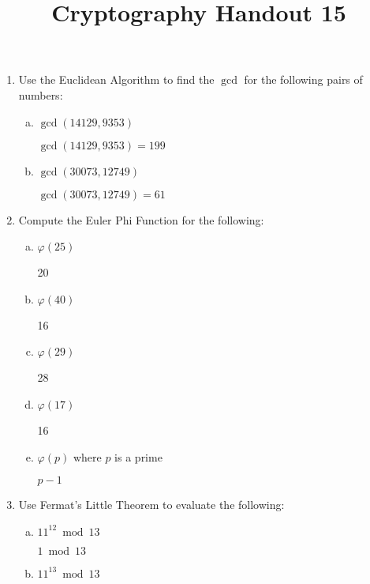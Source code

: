 \documentclass[12pt]{amsart}
\makeatletter
\def\subtitle#1{\gdef\@subtitle{#1}}
\def\@subtitle{}
\theoremstyle{plain}
\theoremstyle{definition}
\theoremstyle{remark}
\makeatother
\begin{document}
\onehalfspacing

\title[]{Cryptography Handout 15}
\subtitle{Number Theory Practice Solutions}
\maketitle

\begin{enumerate}[1.]
	\item Use the Euclidean Algorithm to find the $\gcd$ for the following pairs of numbers:
	\begin{enumerate}[a.]
		\item $\gcd(14129,9353)$
			\begin{framed}
			$\gcd(14129,9353) = 199$
			\end{framed}
		\item $\gcd(30073, 12749)$
			\begin{framed}
			$\gcd(30073, 12749) = 61$
			\end{framed}
	\end{enumerate}
	\item Compute the Euler Phi Function for the following:
	\begin{enumerate}[a.]	
		\item $\varphi(25)$
			\begin{framed}
			20
			\end{framed}
		\item $\varphi(40)$
			\begin{framed}
			16
			\end{framed}	
		\item $\varphi(29)$
			\begin{framed}
			28
			\end{framed}
		\item $\varphi(17)$
			\begin{framed}
			16
			\end{framed}
		\item $\varphi(p)$ where $p$ is a prime
			\begin{framed}
			$p-1$
			\end{framed}
	\end{enumerate}
	\item Use Fermat's Little Theorem to evaluate the following:
		\begin{enumerate}[a.]
			\item $11^{12} \bmod 13$
				\begin{framed}
				$1 \bmod 13$
				\end{framed}
			\newpage \item $11^{13} \bmod 13$

\end{enumerate}
\end{enumerate}
\end{document}

